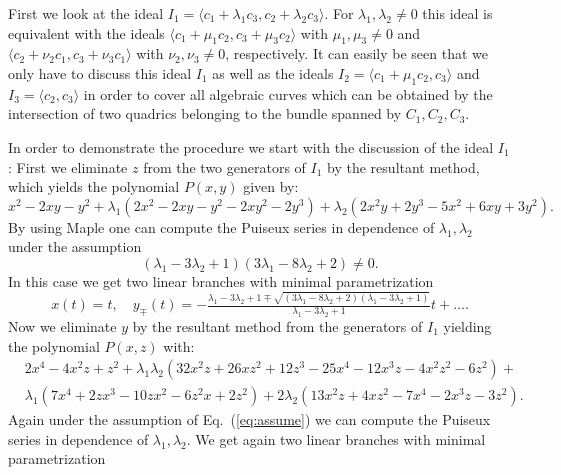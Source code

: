\documentclass{svproc}
\begin{document}
\begin{example}\label{ex3}
First we look at the ideal $I_1=\langle c_1+\lambda_1c_3,c_2+\lambda_2c_3\rangle$. For $\lambda_1,\lambda_2\neq 0$ this ideal is equivalent with the ideals
$\langle c_1+\mu_1c_2,c_3+\mu_3c_2\rangle$ with $\mu_1,\mu_3\neq 0$
and 
$\langle c_2+\nu_2c_1,c_3+\nu_3c_1\rangle$
with $\nu_2,\nu_3\neq 0$, respectively. 
It can easily be seen that we only have to discuss this ideal $I_1$ as well as the ideals 
    $I_2=\langle c_1+\mu_1c_2,c_3\rangle$ and 
    $I_3=\langle c_2,c_3\rangle$
in order to cover all algebraic curves which can be obtained by the intersection of two quadrics belonging to the bundle spanned by $C_1,C_2,C_3$. 

In order to demonstrate the procedure we start with the discussion of the ideal $I_1$:
First we eliminate $z$ from the two generators of $I_1$ by the resultant method, which yields the polynomial $P(x,y)$ given by:
\begin{equation*}
x^2 - 2xy - y^2 
+ \lambda_1(2x^2 - 2xy - y^2 - 2xy^2 - 2y^3) + 
\lambda_2 (2x^2y + 2y^3  - 5x^2 + 6xy + 3y^2). 
\end{equation*}
By using {\sc Maple} one can compute the Puiseux series in dependence of $\lambda_1,\lambda_2$ under the assumption 
\begin{equation}\label{eq:assume}
 (\lambda_1-3\lambda_2+1)(3\lambda_1-8\lambda_2+2)\neq 0.   
\end{equation}
 In this case we get two linear branches with minimal parametrization
\begin{equation}
x(t)=t, \quad y_{\mp}(t)= -\tfrac{ \lambda_1 - 3\lambda_2 +1 \mp \sqrt{(3\lambda_1 - 8\lambda_2 + 2)(\lambda_1 - 3\lambda_2 + 1)} }{\lambda_1 - 3\lambda_2 + 1}t
+\ldots .
\end{equation} 
Now we eliminate $y$ by the resultant method from the generators of $I_1$ yielding the polynomial $P(x,z)$ with:
\begin{equation}
\begin{split}
 &2x^4 - 4x^2z + z^2
  +\lambda_1\lambda_2(32x^2z + 26xz^2 + 12z^3 -25x^4 - 12x^3z - 4x^2z^2  - 6z^2) +\\
 &\lambda_1( 7x^4+ 2zx^3-10 z x^2-6 z^2 x+2 z^2)
 +2\lambda_2(13x^2z + 4xz^2 -7x^4 - 2x^3z  - 3z^2).
\end{split}
\end{equation}
Again under the assumption of Eq.\ (\ref{eq:assume}) we can compute the  Puiseux series in dependence of $\lambda_1,\lambda_2$. We get again two linear branches with minimal parametrization

\end{example}
\end{document}
